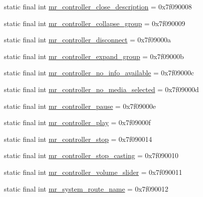 \begin{CompactItemize}
\item 
static final int \hyperlink{classandroid_1_1support_1_1graphics_1_1drawable_1_1_r_1_1string_b2aa05f72c93cc92a0046207530a2cf1}{mr\_\-controller\_\-close\_\-description} = 0x7f090008
\item 
static final int \hyperlink{classandroid_1_1support_1_1graphics_1_1drawable_1_1_r_1_1string_6e80f85fdfecb4357a557ad9cfe8066e}{mr\_\-controller\_\-collapse\_\-group} = 0x7f090009
\item 
static final int \hyperlink{classandroid_1_1support_1_1graphics_1_1drawable_1_1_r_1_1string_aa0adc4acd46479d52192b1e344ffb4b}{mr\_\-controller\_\-disconnect} = 0x7f09000a
\item 
static final int \hyperlink{classandroid_1_1support_1_1graphics_1_1drawable_1_1_r_1_1string_7570e715f42687b75b4ac41d40f2413a}{mr\_\-controller\_\-expand\_\-group} = 0x7f09000b
\item 
static final int \hyperlink{classandroid_1_1support_1_1graphics_1_1drawable_1_1_r_1_1string_5e49eed7ce312014b8adc9b7c0e707a8}{mr\_\-controller\_\-no\_\-info\_\-available} = 0x7f09000c
\item 
static final int \hyperlink{classandroid_1_1support_1_1graphics_1_1drawable_1_1_r_1_1string_5236b7bb1def85229c4550de91f26dc1}{mr\_\-controller\_\-no\_\-media\_\-selected} = 0x7f09000d
\item 
static final int \hyperlink{classandroid_1_1support_1_1graphics_1_1drawable_1_1_r_1_1string_0b9723cb496afb8200b770b0e0e38bff}{mr\_\-controller\_\-pause} = 0x7f09000e
\item 
static final int \hyperlink{classandroid_1_1support_1_1graphics_1_1drawable_1_1_r_1_1string_32cef6e7ad1575e937ac0fd8731981ae}{mr\_\-controller\_\-play} = 0x7f09000f
\item 
static final int \hyperlink{classandroid_1_1support_1_1graphics_1_1drawable_1_1_r_1_1string_a2f0d9a97881771537343c609b7f0174}{mr\_\-controller\_\-stop} = 0x7f090014
\item 
static final int \hyperlink{classandroid_1_1support_1_1graphics_1_1drawable_1_1_r_1_1string_9b455c3c4d700856984bc5f3624e6aff}{mr\_\-controller\_\-stop\_\-casting} = 0x7f090010
\item 
static final int \hyperlink{classandroid_1_1support_1_1graphics_1_1drawable_1_1_r_1_1string_3018d065f7924b9f4b89c514773c9aef}{mr\_\-controller\_\-volume\_\-slider} = 0x7f090011
\item 
static final int \hyperlink{classandroid_1_1support_1_1graphics_1_1drawable_1_1_r_1_1string_024f62ed4a136c23d1f0410a9aabfa9c}{mr\_\-system\_\-route\_\-name} = 0x7f090012

\end{CompactItemize}
